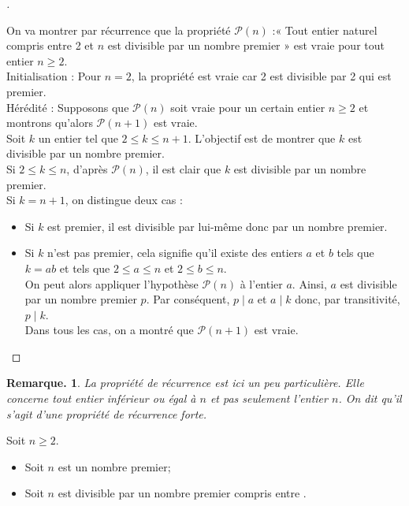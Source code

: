 \documentclass[12pt]{article}
\newcommand{\hide}[1]{\mbox{\vphantom{#1}\smash{\colorbox{gray!50}{\phantom{#1}}}}}
\theoremstyle{break}
\newtheorem*{remark}{Remarque.}
\newenvironment{demo}[1][\proofname]{%
  \begin{proof}[#1]$ $\newline
}{%
  \end{proof}
}
\begin{document}
\begin{demo}
On va montrer par récurrence que la propriété $\mathcal{P}(n)$ :« Tout entier naturel compris entre 2 et $n$ est divisible par un nombre premier » est vraie pour tout entier $n \geqslant 2$.\\
Initialisation : Pour $n=2$, la propriété est vraie car 2 est divisible par 2 qui est premier.\\
Hérédité : Supposons que $\mathcal{P}(n)$ soit vraie pour un certain entier $n \geqslant 2$ et montrons qu'alors $\mathcal{P}(n+1)$ est vraie.\\
Soit $k$ un entier tel que $2 \leqslant k \leqslant n+1$. L'objectif est de montrer que $k$ est divisible par un nombre premier.\\
Si $2 \leqslant k \leqslant n$, d'après $\mathcal{P}(n)$, il est clair que $k$ est divisible par un nombre premier.\\
Si $k=n+1$, on distingue deux cas :

\begin{itemize}[noitemsep,topsep=0pt]
  \item Si $k$ est premier, il est divisible par lui-même donc par un nombre premier.
  \item Si $k$ n'est pas premier, cela signifie qu'il existe des entiers $a$ et $b$ tels que $k=a b$ et tels que $2 \leqslant a \leqslant n$ et $2 \leqslant b \leqslant n$.\\
On peut alors appliquer l'hypothèse $\mathcal{P}(n)$ à l'entier $a$. Ainsi, $a$ est divisible par un nombre premier $p$. Par conséquent, $p \mid a$ et $a \mid k$ donc, par transitivité, $p \mid k$.\\
Dans tous les cas, on a montré que $\mathcal{P}(n+1)$ est vraie.
\end{itemize}
\end{demo}

\begin{remark}
  La propriété de récurrence est ici un peu particulière. Elle concerne tout entier inférieur ou égal à $n$ et pas seulement l'entier $n$. On dit qu'il s'agit d'une propriété de récurrence forte.
\end{remark}

\begin{proposition}{}{}
Soit $n \geqslant 2$.
\begin{itemize}[noitemsep,topsep=0pt]
  \item Soit $n$ est un nombre premier;
  \item Soit $n$ est divisible par un nombre premier compris entre \hide{2 et $\sqrt{n}$}.
\end{itemize}
\end{proposition}
\end{document}
